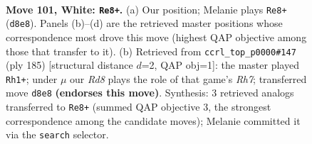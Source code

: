 \documentclass[11pt]{article}
\begin{document}
\begin{figure}[p]\centering
\begin{subfigure}{0.46\textwidth}\centering
\resizebox{\linewidth}{!}{%
\newchessgame
\chessboard[
  setfen={3R4/8/8/4k3/7r/r7/5K2/8 w - - 12 101},
  showmover=false,
  pgfstyle=straightmove, color=movearrow, markmove={d8-e8}
]}
\caption{}
\end{subfigure}\hfill
\begin{subfigure}{0.46\textwidth}\centering
\resizebox{\linewidth}{!}{%
\newchessgame
\chessboard[
  setfen={1k6/8/8/8/8/2R5/7r/3K4 b - - 17 93},
  showmover=false,
  pgfstyle=straightmove, color=movearrow, markmove={h2-h1}
]}
\caption{}
\end{subfigure}
\\[4pt]

\caption{\textbf{Move 101, White: \texttt{Re8+}.} (a) Our position; Melanie plays \texttt{Re8+} (\texttt{d8e8}). Panels (b)--(d) are the retrieved master positions whose correspondence most drove this move (highest QAP objective among those that transfer to it). (b) Retrieved from \texttt{ccrl\_top\_p0000\#147} (ply 185) [structural distance $d$=2, QAP obj=1]: the master played \texttt{Rh1+}; under $\mu$ our \emph{Rd8} plays the role of that game's \emph{Rh7}; transferred move \texttt{d8e8} \textbf{(endorses this move)}. Synthesis: 3 retrieved analogs transferred to \texttt{Re8+} (summed QAP objective 3, the strongest correspondence among the candidate moves); Melanie committed it via the \texttt{search} selector.}
\label{fig:thought-m200}
\end{figure}

\clearpage
\end{document}
